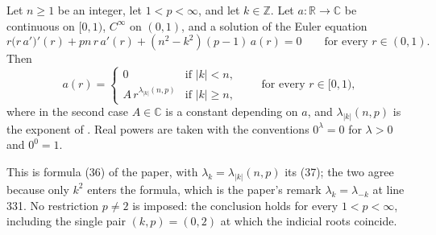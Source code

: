 \begin{lemma}
Let $n\ge1$ be an integer, let $1<p<\infty$, and let
$k\in\mathbb{Z}$.  Let $a\colon\mathbb{R}\to\mathbb{C}$ be continuous on
$[0,1)$, $C^\infty$ on $(0,1)$, and a solution of the Euler equation
\[
  r\bigl(r\,a'\bigr)'(r)+pn\,r\,a'(r)+(n^2-k^2)(p-1)\,a(r)=0
  \qquad\text{for every }r\in(0,1).
\]
Then
\[
  a(r)=\begin{cases}
    0 & \text{if }|k|<n,\\
    A\,r^{\lambda_{|k|}(n,p)} & \text{if }|k|\ge n,
  \end{cases}
  \qquad\text{for every }r\in[0,1),
\]
where in the second case $A\in\mathbb{C}$ is a constant depending on $a$, and
$\lambda_{|k|}(n,p)$ is the exponent of .  Real powers are
taken with the conventions $0^{\lambda}=0$ for $\lambda>0$ and $0^{0}=1$.

This is formula (36) of the paper, with $\lambda_k=\lambda_{|k|}(n,p)$ its (37);
the two agree because only $k^2$ enters the formula, which is the paper's remark
$\lambda_k=\lambda_{-k}$ at line 331.  No restriction $p\neq2$ is imposed: the
conclusion holds for every $1<p<\infty$, including the single pair $(k,p)=(0,2)$
at which the indicial roots coincide.
\end{lemma}
